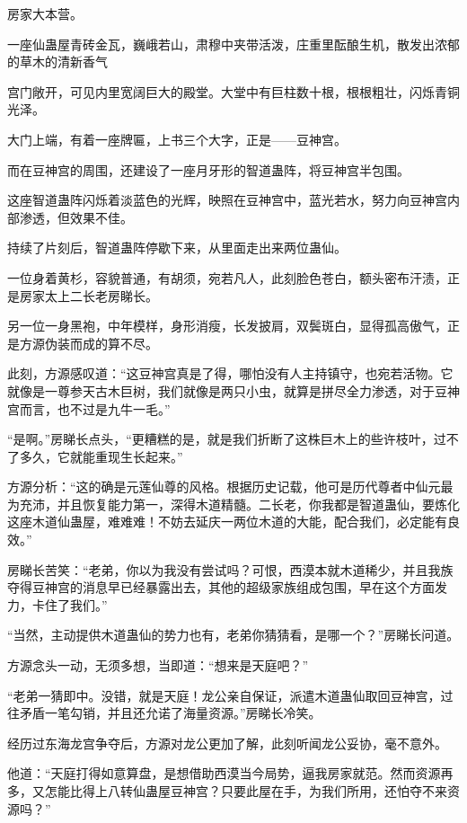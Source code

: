 
\begin{this_body}

房家大本营。

一座仙蛊屋青砖金瓦，巍峨若山，肃穆中夹带活泼，庄重里酝酿生机，散发出浓郁的草木的清新香气

宫门敞开，可见内里宽阔巨大的殿堂。大堂中有巨柱数十根，根根粗壮，闪烁青铜光泽。

大门上端，有着一座牌匾，上书三个大字，正是——豆神宫。

而在豆神宫的周围，还建设了一座月牙形的智道蛊阵，将豆神宫半包围。

这座智道蛊阵闪烁着淡蓝色的光辉，映照在豆神宫中，蓝光若水，努力向豆神宫内部渗透，但效果不佳。

持续了片刻后，智道蛊阵停歇下来，从里面走出来两位蛊仙。

一位身着黄杉，容貌普通，有胡须，宛若凡人，此刻脸色苍白，额头密布汗渍，正是房家太上二长老房睇长。

另一位一身黑袍，中年模样，身形消瘦，长发披肩，双鬓斑白，显得孤高傲气，正是方源伪装而成的算不尽。

此刻，方源感叹道：“这豆神宫真是了得，哪怕没有人主持镇守，也宛若活物。它就像是一尊参天古木巨树，我们就像是两只小虫，就算是拼尽全力渗透，对于豆神宫而言，也不过是九牛一毛。”

“是啊。”房睇长点头，“更糟糕的是，就是我们折断了这株巨木上的些许枝叶，过不了多久，它就能重现生长起来。”

方源分析：“这的确是元莲仙尊的风格。根据历史记载，他可是历代尊者中仙元最为充沛，并且恢复能力第一，深得木道精髓。二长老，你我都是智道蛊仙，要炼化这座木道仙蛊屋，难难难！不妨去延庆一两位木道的大能，配合我们，必定能有良效。”

房睇长苦笑：“老弟，你以为我没有尝试吗？可恨，西漠本就木道稀少，并且我族夺得豆神宫的消息早已经暴露出去，其他的超级家族组成包围，早在这个方面发力，卡住了我们。”

“当然，主动提供木道蛊仙的势力也有，老弟你猜猜看，是哪一个？”房睇长问道。

方源念头一动，无须多想，当即道：“想来是天庭吧？”

“老弟一猜即中。没错，就是天庭！龙公亲自保证，派遣木道蛊仙取回豆神宫，过往矛盾一笔勾销，并且还允诺了海量资源。”房睇长冷笑。

经历过东海龙宫争夺后，方源对龙公更加了解，此刻听闻龙公妥协，毫不意外。

他道：“天庭打得如意算盘，是想借助西漠当今局势，逼我房家就范。然而资源再多，又怎能比得上八转仙蛊屋豆神宫？只要此屋在手，为我们所用，还怕夺不来资源吗？”


\end{this_body}
